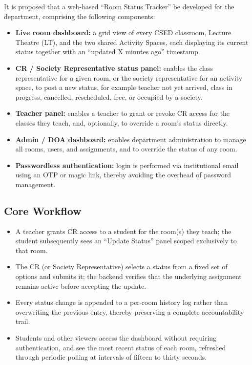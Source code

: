 \documentclass[11pt]{article}
\begin{document}
It is proposed that a web-based ``Room Status Tracker'' be developed for the department, comprising the following components:

\begin{itemize}
    \item \textbf{Live room dashboard:} a grid view of every CSED classroom, Lecture Theatre (LT), and the two shared Activity Spaces, each displaying its current status together with an ``updated X minutes ago'' timestamp.
    \item \textbf{CR / Society Representative status panel:} enables the class representative for a given room, or the society representative for an activity space, to post a new status, for example teacher not yet arrived, class in progress, cancelled, rescheduled, free, or occupied by a society.
    \item \textbf{Teacher panel:} enables a teacher to grant or revoke CR access for the classes they teach, and, optionally, to override a room's status directly.
    \item \textbf{Admin / DOA dashboard:} enables department administration to manage all rooms, users, and assignments, and to override the status of any room.
    \item \textbf{Passwordless authentication:} login is performed via institutional email using an OTP or magic link, thereby avoiding the overhead of password management.
\end{itemize}

\subsection{Core Workflow}

\begin{itemize}
    \item A teacher grants CR access to a student for the room(s) they teach; the student subsequently sees an ``Update Status'' panel scoped exclusively to that room.
    \item The CR (or Society Representative) selects a status from a fixed set of options and submits it; the backend verifies that the underlying assignment remains active before accepting the update.
    \item Every status change is appended to a per-room history log rather than overwriting the previous entry, thereby preserving a complete accountability trail.
    \item Students and other viewers access the dashboard without requiring authentication, and see the most recent status of each room, refreshed through periodic polling at intervals of fifteen to thirty seconds.
\end{itemize}
\end{document}
